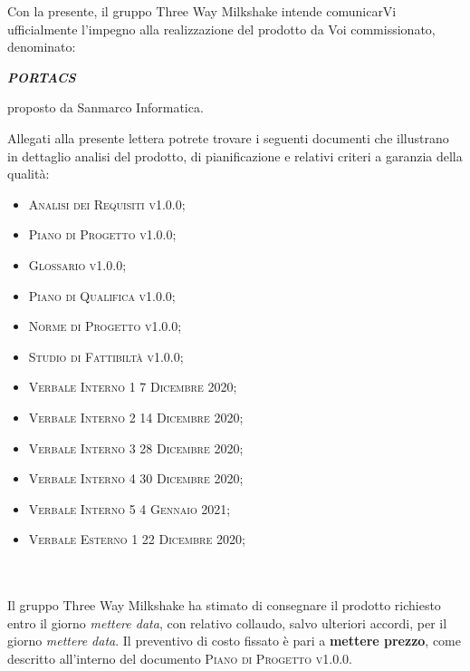 \documentclass[10pt,stdletter,dateno,sigright]{newlfm}  %
\begin{document}
\begin{newlfm}


Con la presente, il gruppo Three Way Milkshake intende comunicarVi ufficialmente l'impegno alla realizzazione del prodotto da Voi commissionato, denominato:
\begin{center}
    \textbf{\textit{PORTACS}}
\end{center}
proposto da Sanmarco Informatica.

Allegati alla presente lettera potrete trovare i seguenti documenti che illustrano in dettaglio analisi del prodotto, di pianificazione e relativi criteri a garanzia della qualità:

\begin{itemize}
	\item \textsc{Analisi dei Requisiti v1.0.0;}
    \item \textsc{Piano di Progetto v1.0.0;}
    \item \textsc{Glossario v1.0.0;}
    \item \textsc{Piano di Qualifica v1.0.0;}
    \item \textsc{Norme di Progetto v1.0.0;}
    \item \textsc{Studio di Fattibiltà v1.0.0;}
    \item \textsc{Verbale Interno 1 7 Dicembre 2020;}
    \item \textsc{Verbale Interno 2 14 Dicembre 2020;}
    \item \textsc{Verbale Interno 3 28 Dicembre 2020;}
    \item \textsc{Verbale Interno 4 30 Dicembre 2020;}
    \item \textsc{Verbale Interno 5 4 Gennaio 2021;}
    \item \textsc{Verbale Esterno 1 22 Dicembre 2020;}
\end{itemize}   
\ \\
\ \\
Il gruppo Three Way Milkshake ha stimato di consegnare il prodotto richiesto entro il giorno \textit{mettere data}, con relativo collaudo, salvo ulteriori accordi, per il giorno \textit{mettere data}. 
Il preventivo di costo fissato \`e pari a \textbf{mettere prezzo}, come descritto all'interno del documento \textsc{Piano di Progetto v1.0.0}.
\\


\end{newlfm}
\end{document}
